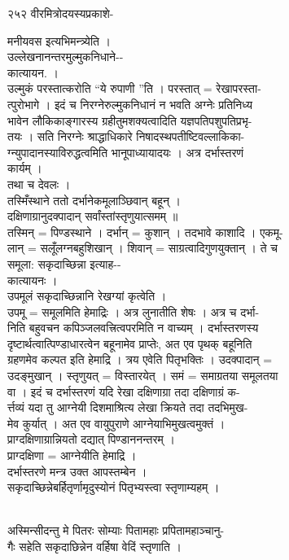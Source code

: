 \documentclass[11pt, openany]{book}
\begin{document}
{{{{{{{{{{{{२५२ वीरमित्रोदयस्यप्रकाशे-  

{मनीयवस इत्यभिमन्त्र्येति ।\\
उल्लेखनानन्तरमुल्मुकनिधाने-\/-\\
कात्यायन. ।\\
उल्मुकं परस्तात्करोति ``ये रुपाणी ''ति । परस्तात् = रेखापरस्ता-\\
त्पुरोभागे । इदं च निरग्नेरुल्मुकनिधानं न भवति अग्नेः प्रतिनिध्य\\
भावेन लौकिकाङ्गारस्य ग्रहीतुमशक्यत्वादिति यज्ञपतिपशुपतिप्रभृ-\\
तयः । सति निरग्नेः श्राद्धाधिकारे निषादस्थपतीष्टिवल्लाकिका-\\
ग्न्युपादानस्याविरुद्धत्वमिति भानूपाध्यायादयः । अत्र दर्भास्तरणं\\
कार्यम् ।\\
तथा च देवलः ।\\
तस्मिँस्थाने ततो दर्भानेकमूलाञ्छिवान् बहून् ।\\
दक्षिणाग्रानुदक्पादान् सर्वांस्तांस्तृणुयात्समम् ॥\\
तस्मिन् = पिण्डस्थाने । दर्भान् = कुशान् । तदभावे काशादि । एकमू-\\
लान् = सलूँलग्नबहुशिखान् । शिवान् = साग्रत्वादिगुणयुक्तान् । ते च\\
समूला: सकृदाच्छिन्ना इत्याह-\/-\\
कात्यायनः ।\\
उपमूलं सकृदाच्छिन्नानि रेखग्यां कृत्वेति ।\\
उपमू = समूलमिति हेमाद्रिः । अत्र लुनातीति शेषः । अत्र च दर्भा-\\
निति बहुवचन कपिञ्जलवत्त्रित्वपरमिति न वाच्यम् । दर्भास्तरणस्य\\
दृष्टार्थत्वात्पिण्डाधारत्वेन बहूनामेव प्राप्तेः, अत एव पृथक् बहूनिति\\
ग्रहणमेव कल्पत इति हेमाद्रि । त्रय एवेति पितृभक्तिः । उदक्पादान् =\\
उदङ्मुखान् । स्तृणुयत् = विस्तारयेत् । समं = समाग्रतया समूलतया\\
वा । इदं च दर्भास्तरणं यदि रेखा दक्षिणाग्रा तदा दक्षिणाग्रं क-\\
र्त्तव्यं यदा तु आग्नेयी दिशमाश्रित्य लेखा क्रियते तदा तदभिमुख-\\
मेव कुर्यात् । अत एव वायुपुराणे आग्नेयाभिमुखत्वमुक्तं ।\\
प्राग्दक्षिणाग्रान्नियतो दद्यात् पिण्डाननन्तरम् ।\\
प्राग्दक्षिणा = आग्नेयीति हेमाद्रि ।\\
दर्भास्तरणे मन्त्र उक्त आपस्तम्बेन ।\\
सकृदाच्छिन्नेबर्हितृर्णामृदुस्योनं पितृभ्यस्त्वा स्तृणाम्यहम् }{।}{\\
अस्मिन्सीदन्तु मे पितरः सोम्याः पितामहाः प्रपितामहाञ्चानु-\\
गैः सहेति सकृदाछिन्नेन वर्हिषा वेदिं स्तृणाति ।

}}}}}}}}}}}}}
\end{document}
